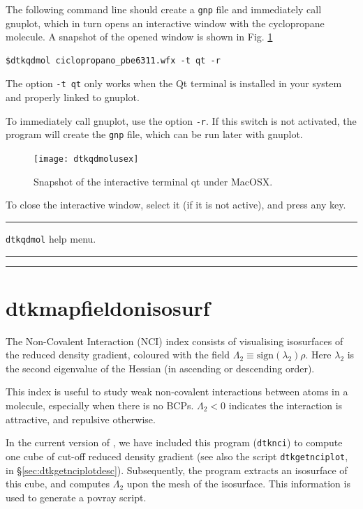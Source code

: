 The following command line should create a \texttt{gnp} file and immediately call gnuplot, which in turn opens an interactive window with the cyclopropane molecule. A snapshot of the opened window is shown in Fig. \ref{fig:dtkqdmolusex}\\
\begin{lstlisting}
$dtkqdmol ciclopropano_pbe6311.wfx -t qt -r
\end{lstlisting}
The option \texttt{-t qt} only works when the Qt terminal is installed in your system and properly linked to gnuplot.

To immediately call gnuplot, use the option \texttt{-r}. If this switch is not activated, the program will create the \texttt{gnp} file, which can be run later with gnuplot.
%
\begin{figure}[hb!]
\centering
\texttt{[image: dtkqdmolusex]}
\caption{Snapshot of the interactive terminal qt under MacOSX.}\label{fig:dtkqdmolusex}
\end{figure}
%

To close the interactive window, select it (if it is not active), and press any key.

\rule{\textwidth}{1pt}
{\center\texttt{dtkqdmol} help menu.\\}
\rule{\textwidth}{1pt}
\begin{footnotesize}
\end{footnotesize}
\rule{\textwidth}{1pt}

\section{\label{sec:dtkmapfieldonisosurf}dtkmapfieldonisosurf}

The Non-Covalent Interaction (NCI) index consists of visualising isosurfaces of the
reduced density gradient, coloured with the field $\Lambda_2\equiv\textrm{sign}(\lambda_2)\rho$.
Here $\lambda_2$ is the second eigenvalue of the Hessian (in ascending or descending order).

This index is useful to study weak non-covalent interactions between atoms in a molecule, especially
when there is no BCPs. $\Lambda_2<0$ indicates the interaction is attractive, and repulsive otherwise.

In the current version of \DTK, we have included this program (\texttt{dtknci}) to compute
one cube of cut-off reduced density gradient (see also the script \texttt{dtkgetnciplot}, in
\S\ref{sec:dtkgetnciplotdesc}). Subsequently, the program extracts an isosurface of this cube,
and computes $\Lambda_2$ upon the mesh of the isosurface. This information is used to
generate a povray script.

